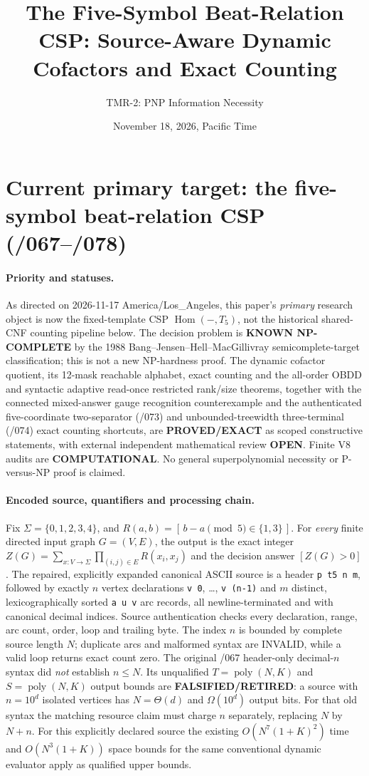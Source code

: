 \documentclass[11pt]{article}
\title{The Five-Symbol Beat-Relation CSP: Source-Aware Dynamic Cofactors and Exact Counting}
\author{TMR-2: PNP Information Necessity}
\date{November 18, 2026, Pacific Time}
\begin{document}
\maketitle

\section{Current primary target: the five-symbol beat-relation CSP (/067--/078)}
\paragraph{Priority and statuses.}
As directed on 2026-11-17 America/Los\_Angeles, this paper's
\emph{primary} research object is now the fixed-template CSP
$\operatorname{Hom}(-,T_5)$, not the historical shared-CNF
counting pipeline below.  The decision problem is \textbf{KNOWN
NP-COMPLETE} by the 1988 Bang--Jensen--Hell--MacGillivray
semicomplete-target classification; this is not a new NP-hardness
proof.  The dynamic cofactor quotient, its 12-mask reachable
alphabet, exact counting and the all-order OBDD and syntactic adaptive
read-once restricted rank/size theorems, together with the connected
mixed-answer gauge recognition counterexample and the authenticated
five-coordinate two-separator (/073) and unbounded-treewidth three-terminal (/074) exact counting shortcuts, are \textbf{PROVED/EXACT} as
scoped constructive statements, with external independent
mathematical review \textbf{OPEN}.  Finite V8 audits are
\textbf{COMPUTATIONAL}.  No general superpolynomial necessity
or P-versus-NP proof is claimed.

\paragraph{Encoded source, quantifiers and processing chain.}
Fix $\Sigma=\{0,1,2,3,4\}$, and
$R(a,b)=[\,b-a\pmod 5\in\{1,3\}\,]$.
For \emph{every} finite directed input graph $G=(V,E)$,
the output is the exact integer
$Z(G)=\sum_{x:V\to\Sigma}\prod_{(i,j)\in E}R(x_i,x_j)$
and the decision answer $[Z(G)>0]$.
The repaired, explicitly expanded canonical ASCII source is a
header \texttt{p t5 n m}, followed by exactly $n$ vertex
declarations \texttt{v 0}, \ldots, \texttt{v (n-1)} and
$m$ distinct, lexicographically sorted \texttt{a u v} arc
records, all newline-terminated and with canonical decimal
indices.  Source authentication checks every declaration,
range, arc count, order, loop and trailing byte. The index
$n$ is bounded by complete source length $N$; duplicate
arcs and malformed syntax are INVALID, while a valid loop
returns exact count zero. The original /067 header-only
decimal-$n$ syntax did \emph{not} establish $n\le N$.
Its unqualified $T=\operatorname{poly}(N,K)$ and
$S=\operatorname{poly}(N,K)$ output bounds are
\textbf{FALSIFIED/RETIRED}: a source with $n=10^d$ isolated
vertices has $N=\Theta(d)$ and $\Omega(10^d)$ output bits.
For that old syntax the matching resource claim must
charge $n$ separately, replacing $N$ by $N+n$.
For this explicitly declared source the existing
$O(N^7(1+K)^2)$ time and $O(N^3(1+K))$ space
bounds for the same conventional dynamic evaluator
apply as qualified upper bounds.
\end{document}
